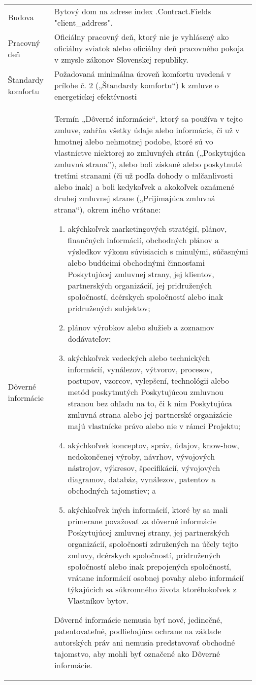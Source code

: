\documentclass[a4paper]{article}
\begin{document}
\begin{longtabu}{|X|X[2]|}
   \hline

   Budova & Bytový dom na adrese  {{index .Contract.Fields "client_address"}}. \\\tabucline{}

   \hline

   Pracovný deň & Oficiálny pracovný deň, ktorý nie je vyhlásený ako oficiálny sviatok alebo oficiálny deň pracovného pokoja v zmysle zákonov Slovenskej republiky. \\\tabucline{}

   \hline

   Štandardy komfortu & Požadovaná minimálna úroveň komfortu uvedená v prílohe č. 2 („Štandardy komfortu“) k zmluve o energetickej efektívnosti \\\tabucline{}

   \hline

   Dôverné informácie& Termín „Dôverné informácie“, ktorý sa používa v tejto zmluve, zahŕňa všetky údaje alebo informácie, či už v hmotnej alebo nehmotnej podobe, ktoré sú vo vlastníctve niektorej zo zmluvných strán („Poskytujúca zmluvná strana”), alebo boli získané alebo poskytnuté tretími stranami (či už podľa dohody o mlčanlivosti alebo inak) a boli kedykoľvek a akokoľvek oznámené druhej zmluvnej strane („Prijímajúca zmluvná strana“), okrem iného vrátane: 
   \begin{enumerate}
       \item akýchkoľvek marketingových stratégií, plánov, finančných informácií, obchodných plánov a výsledkov výkonu súvisiacich s minulými, súčasnými alebo budúcimi obchodnými činnosťami Poskytujúcej zmluvnej strany, jej klientov, partnerských organizácií, jej pridružených spoločností, dcérskych spoločností alebo inak pridružených subjektov;
       \item plánov výrobkov alebo služieb a zoznamov dodávateľov; 
       \item 	akýchkoľvek vedeckých alebo technických informácií, vynálezov, výtvorov, procesov, postupov, vzorcov, vylepšení, technológií alebo metód poskytnutých Poskytujúcou zmluvnou stranou bez ohľadu na to, či k nim Poskytujúca zmluvná strana alebo  jej partnerské organizácie majú vlastnícke právo alebo nie v rámci Projektu; 
       \item akýchkoľvek konceptov, správ, údajov, know-how, nedokončenej výroby, návrhov, vývojových nástrojov, výkresov, špecifikácií, vývojových diagramov, databáz, vynálezov, patentov a obchodných tajomstiev; a
       \item akýchkoľvek iných informácií, ktoré by sa mali primerane považovať za dôverné informácie Poskytujúcej zmluvnej strany, jej partnerských organizácií, spoločností združených na účely tejto zmluvy, dcérskych spoločností, pridružených spoločností alebo inak prepojených spoločností, vrátane informácií osobnej povahy alebo informácií týkajúcich sa súkromného života ktoréhokoľvek z Vlastníkov bytov. 
    \end{enumerate}
   Dôverné informácie nemusia byť nové, jedinečné, patentovateľné, podliehajúce ochrane na základe autorských práv ani nemusia predstavovať obchodné tajomstvo, aby mohli byť označené ako Dôverné informácie. 
   


\end{longtabu}
\end{document}
